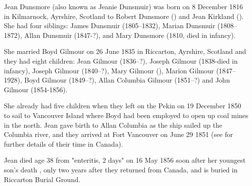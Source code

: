 
Jean Dunsmore (also known as Jeanie Dunsmuir) was born on 8 December 1816 in Kilmarnock, Ayrshire, Scotland to Robert Dunsmore () and Jean Kirkland ().  She had four siblings:  James Dunsmuir (1805--1832), Marian Dunsmuir (1808--1872), Allan Dunsmuir (1847-?),  and Mary Dunsmore (1810, died in infancy).

She married Boyd Gilmour on 26 June 1835  in Riccarton, Ayrshire, Scotland \cite{JeanDunsmoreMarraige} and they had eight children:  Jean Gilmour (1836--?), Joseph Gilmour (1838-died in infancy), Joseph Gilmour (1840--?), 
Mary Gilmour (), Marion Gilmour (1847--1928), Boyd Gilmour (1849--?), Allan Columbia Gilmour (1851--?) and John Gilmour (1854-1856).

She already had five children when they left on the Pekin on 19 December 1850 to sail to Vancouver Island where Boyd had been employed to open up coal mines in the north. Jean gave birth to Allan Columbia as the ship sailed up the Columbia river, and they arrived at Fort Vancouver on June 29 1851 (see  for further details of their time in Canada).  

Jean died age 38 from "enteritis, 2 days"  on 16 May 1856 soon after her youngest son's death \cite{JeanDunsmuirDeath}, only two years after they returned from Canada, and is buried in Riccarton Burial Ground.
